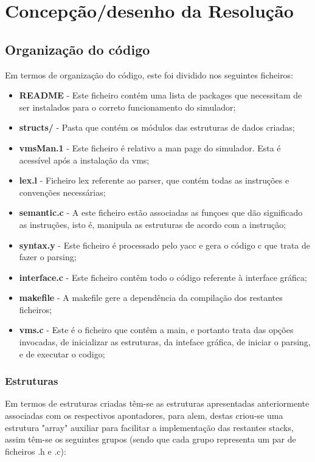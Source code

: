 \documentclass{report}
\begin{document}
\chapter{Concepção/desenho da Resolução}
\section{Organização do código}

Em termos de organização do código, este foi dividido nos seguintes ficheiros:

\begin{itemize}
\item \textbf{README} - Este ficheiro contém uma lista de packages que necessitam de ser instalados para o correto funcionamento do simulador;
\item \textbf{structs/} - Pasta que contém os módulos das estruturas de dados criadas;
\item \textbf{vmsMan.1} - Este ficheiro é relativo a man page do simulador. Esta é acessível após a instalação da vms;
\item \textbf{lex.l} - Ficheiro lex referente ao parser, que contém todas as instruções e convenções necessárias;
\item \textbf{semantic.c} - A este ficheiro estão associadas as funçoes que dão significado as instruções, isto é, manipula as estruturas de acordo com a instrução;
\item \textbf{syntax.y} - Este ficheiro é processado pelo yacc e gera o código c que trata de fazer o parsing;
\item \textbf{interface.c} - Este ficheiro contêm todo o código referente à interface gráfica;
\item \textbf{makefile} - A makefile gere a dependência da compilação dos restantes ficheiros;
\item \textbf{vms.c} - Este é o ficheiro que contêm a main, e portanto trata das opções invocadas, de inicializar as estruturas, da inteface gráfica, de iniciar o parsing, e de executar o codigo;
\end{itemize}

\subsection{Estruturas}

\quad Em termos de estruturas criadas têm-se as estruturas apresentadas anteriormente associadas com os respectivos apontadores, para alem, destas criou-se uma estrutura "array" auxiliar para facilitar a implementação das restantes stacks, assim têm-se os seguintes grupos
(sendo que cada grupo representa um par de ficheiros .h e .c):
\end{document}
